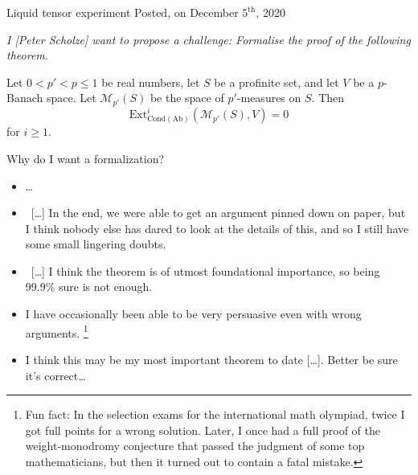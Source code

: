 \documentclass[10pt]{beamer}
\begin{document}
\begin{frame}
{\Large Liquid tensor experiment}
Posted, on December $5^\text{th}$, 2020
\vspace{.5cm}

{\it
I {\rm \textcolor{arancio}{[Peter Scholze]}} want to propose a challenge: Formalise the proof of the following theorem.

\begin{theorem}[Clausen--S.] Let $0<p'<p\leq 1$ be real numbers, let $S$ be a profinite set, and let $V$ be a $p$-Banach space. Let $\mathcal M_{p'}(S)$ be the space of $p'$-measures on $S$. Then
\[
\mathrm{Ext}^i_{\mathrm{Cond}(\mathrm{Ab})}(\mathcal M_{p'}(S),V)=0
\]
for $i\geq 1$.
\end{theorem}}
\vspace{.75cm}
\pause
{}
{
Why do I want a formalization?}
\pause
{}
{\begin{itemize}
\it
\item \dots
\item ~[\dots] In the end, we were able to get an argument pinned down on paper, but I think nobody else has dared to look at the details of this, and so I still have some small lingering doubts.
\item ~[\dots] I think the theorem is of utmost foundational importance, so being 99.9\% sure is not enough.
\item I have occasionally been able to be very persuasive even with wrong arguments. \footnote{Fun fact: In the selection exams for the international math olympiad, twice I got full points for a wrong solution. Later, I once had a full proof of the weight-monodromy conjecture that passed the judgment of some top mathematicians, but then it turned out to contain a fatal mistake.}
\item I think this may be my most important theorem to date [\dots]. Better be sure it’s correct\dots
\end{itemize}}
\end{frame}
\end{document}
